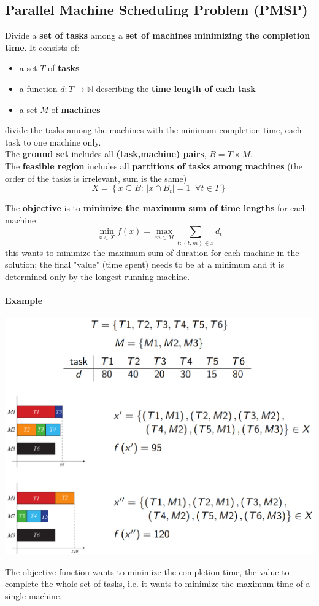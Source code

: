 \subsection{Parallel Machine Scheduling Problem (PMSP)}
Divide a \textbf{set of tasks} among a \textbf{set of machines} \textbf{minimizing the completion time}. It consists of: 
\begin{itemize}
	\item a set $T$ of \textbf{tasks}
	\item a function $d : T \rightarrow \mathbb{N}$ describing the \textbf{time length of each task}
	\item a set $M$ of \textbf{machines}
\end{itemize}
divide the tasks among the machines with the minimum completion time, each task to one machine only.\\

The \textbf{ground set} includes all \textbf{(task,machine) pairs}, $B = T \times M$.\\

The \textbf{feasible region} includes all \textbf{partitions of tasks among machines} (the order of the tasks is irrelevant, sum is the same)
$$ X = \left\{x \subseteq B : \, |x \cap B_t| = 1 \;\; \forall t \in T \right\}$$

The \textbf{objective} is to \textbf{minimize the maximum sum of time lengths} for each machine
$$ \min_{x \in X} f(x) = \max_{m \in M} \sum_{t:(t,m) \in x} d_t $$
this wants to minimize the maximum sum of duration for each machine in the solution; the final "value" (time spent) needs to be at a minimum and it is determined only by the longest-running machine.

\newpage

\paragraph{Example}
\begin{center}
	\includegraphics[width=\columnwidth]{img/PMSP}
\end{center}
The objective function wants to minimize the completion time, the value to complete the whole set of tasks, i.e. it wants to minimize the maximum time of a single machine.

